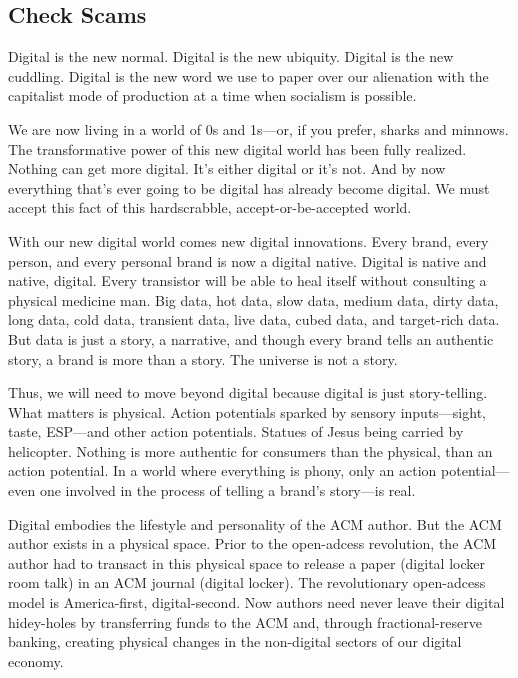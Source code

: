 \subsection{Check Scams}

Digital is the new normal. Digital is the new ubiquity. Digital is the new cuddling. Digital is the new word we use to paper over our alienation with the capitalist mode of production at a time when socialism is possible.

We are now living in a world of 0s and 1s---or, if you prefer, sharks and minnows. The transformative power of this new digital world has been fully realized. Nothing can get more digital. It's either digital or it's not. And by now everything that's ever going to be digital has already become digital. We must accept this fact of this hardscrabble, accept-or-be-accepted world.

With our new digital world comes new digital innovations. Every brand, every person, and every personal brand is now a digital native. Digital is native and native, digital. Every transistor will be able to heal itself without consulting a physical medicine man. Big data, hot data, slow data, medium data, dirty data, long data, cold data, transient data, live data, cubed data, and target-rich data. But data is just a story, a narrative, and though every brand tells an authentic story, a brand is more than a story. The universe is not a story.

Thus, we will need to move beyond digital because digital is just story-telling. What matters is physical. Action potentials sparked by sensory inputs---sight, taste, ESP---and other action potentials. Statues of Jesus being carried by helicopter. Nothing is more authentic for consumers than the physical, than an action potential. In a world where everything is phony, only an action potential---even one involved in the process of telling a brand's story---is real.

Digital embodies the lifestyle and personality of the ACM author. But the ACM author exists in a physical space. Prior to the open-adcess revolution, the ACM author had to transact in this physical space to release a paper (digital locker room talk) in an ACM journal (digital locker). The revolutionary open-adcess model is America-first, digital-second. Now authors need never leave their digital hidey-holes by transferring funds to the ACM and, through fractional-reserve banking, creating physical changes in the non-digital sectors of our digital economy. 

